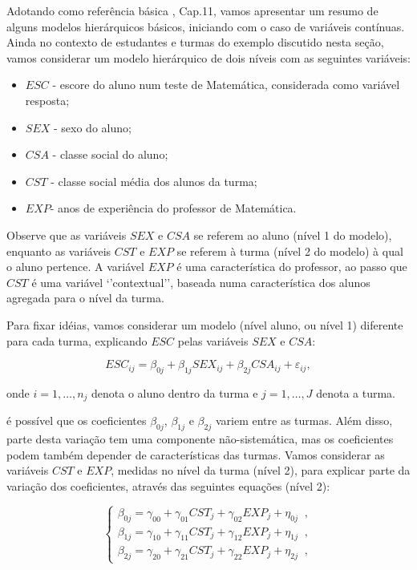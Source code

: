 \documentclass[]{book}
\numberwithin{example}{chapter}
\numberwithin{remark}{chapter}
\numberwithin{definition}{chapter}
\begin{document}
Adotando como referência básica \citep{Sk89a}, Cap.11, vamos apresentar
um resumo de alguns modelos hierárquicos básicos, iniciando com o caso
de variáveis contínuas. Ainda no contexto de estudantes e turmas do
exemplo discutido nesta seção, vamos considerar um modelo hierárquico de
dois níveis com as seguintes variáveis:

\begin{itemize}
\item
  \(ESC\) - escore do aluno num teste de Matemática, considerada como
  variável resposta;
\item
  \(SEX\) - sexo do aluno;
\item
  \(CSA\) - classe social do aluno;
\item
  \(CST\) - classe social média dos alunos da turma;
\item
  \(EXP\)- anos de experiência do professor de Matemática.
\end{itemize}

Observe que as variáveis \(SEX\) e \(CSA\) se referem ao aluno (nível 1
do modelo), enquanto as variáveis \(CST\) e \(EXP\) se referem à turma
(nível 2 do modelo) à qual o aluno pertence. A variável \(EXP\) é uma
característica do professor, ao passo que \(CST\) é uma variável
`'contextual'', baseada numa característica dos alunos agregada para o
nível da turma.

Para fixar idéias, vamos considerar um modelo (nível aluno, ou nível 1)
diferente para cada turma, explicando \(ESC\) pelas variáveis \(SEX\) e
\(CSA\):

\begin{equation}
ESC_{ij}=\beta _{0j}+\beta _{1j}SEX_{ij}+\beta _{2j}CSA_{ij}+\varepsilon
_{ij},  \label{eq:hier9}
\end{equation}

onde \(i=1,\ldots ,n_{j}\) denota o aluno dentro da turma e
\(j=1,\ldots ,J\) denota a turma.

é possível que os coeficientes \(\beta _{0j}\), \(\beta _{1j}\) e
\(\beta _{2j}\) variem entre as turmas. Além disso, parte desta variação
tem uma componente não-sistemática, mas os coeficientes podem também
depender de características das turmas. Vamos considerar as variáveis
\(CST\) e \(EXP\), medidas no nível da turma (nível 2), para explicar
parte da variação dos coeficientes, através das seguintes equações
(nível 2):

\begin{equation}
\left\{ 
\begin{array}{l}
\beta _{0j}=\gamma _{00}+\gamma _{01}CST_{j}+\gamma _{02}EXP_{j}+\eta
_{0j}\;\;, \\ 
\beta _{1j}=\gamma _{10}+\gamma _{11}CST_{j}+\gamma _{12}EXP_{j}+\eta
_{1j}\;\;, \\ 
\beta _{2j}=\gamma _{20}+\gamma _{21}CST_{j}+\gamma _{22}EXP_{j}+\eta
_{2j}\;\;,
\end{array}
\right.  \label{eq:hier10}
\end{equation}
\end{document}
